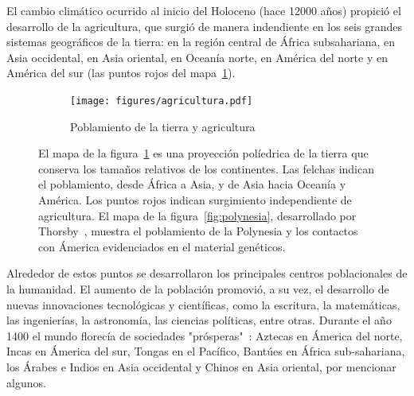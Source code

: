 \documentclass[a4paper,10pt]{book}
\theoremstyle{definition}
\begin{document}
El cambio climático ocurrido al inicio del Holoceno (hace 12000 años) propició el desarrollo de la agricultura, que surgió de manera indendiente en los seis grandes sistemas geográficos de la tierra: en la región central de África subsahariana, en Asia occidental, en Asia oriental, en Oceanía norte, en América del norte y en América del sur (las puntos rojos del mapa~\ref{fig:agricultura}).
\begin{figure}[ht!]
    \centering
    \begin{subfigure}[b]{0.6\textwidth}
     \texttt{[image: figures/agricultura.pdf]}
     \caption{Poblamiento de la tierra y agricultura}
     \label{fig:agricultura}
    \end{subfigure}
    \caption{
    El mapa de la figura~\ref{fig:agricultura} es una proyección políedrica de la tierra que conserva los tamaños relativos de los continentes.
    Las felchas indican el poblamiento, desde África a Asia, y de Asia hacia Oceanía y América.
    Los puntos rojos indican surgimiento independiente de agricultura.
    El mapa de la figura~\ref{fig:polynesia}, desarrollado por Thorsby~\cite{thorsby2016-polynesiaAmerica}, muestra el poblamiento de la Polynesia y los contactos con Ámerica evidenciados en el material genéticos. }%
    \label{fig:poblamiento}
\end{figure}
Alrededor de estos puntos se desarrollaron los principales centros poblacionales de la humanidad.
El aumento de la población promovió, a su vez, el desarrollo de nuevas innovaciones tecnológicas y científicas, como la escritura, la matem\'aticas, las ingenier\'ias, la astronomía, las ciencias políticas, entre otras.
Durante el año 1400 el mundo florecía de sociedades "prósperas"~\cite{dussel2004-sistemaMundo}: Aztecas en Ámerica del norte, Incas en Ámerica del sur, Tongas en el Pacífico, Bantúes en África sub-sahariana, los Árabes e Indios en Asia occidental y Chinos en Asia oriental, por mencionar algunos.

\end{document}
